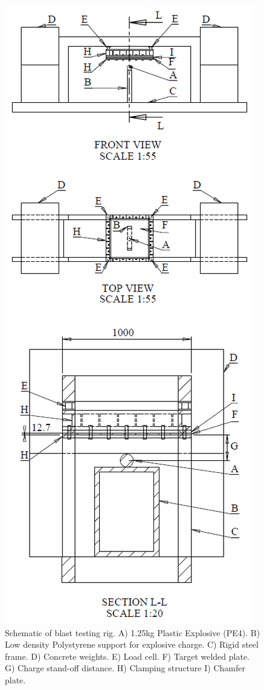 \begin{figure}
	\centering
	\includegraphics[width=0.5\linewidth]{BlastRig4}
	\caption[BlastRig]{Schematic of blast testing rig. A) 1.25kg Plastic Explosive (PE4). B) Low density Polystyrene support for explosive charge. C) Rigid steel frame. D) Concrete weights. E) Load cell. F) Target welded plate. G) Charge stand-off distance. H) Clamping structure I) Chamfer plate.}
	\label{fig:blastrig}
\end{figure} 
